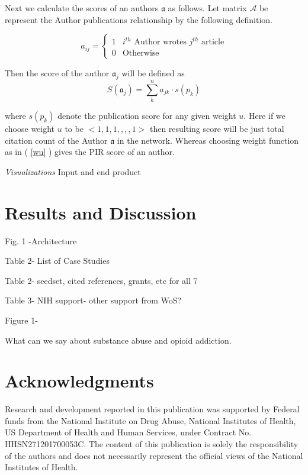 \documentclass[review]{elsarticle}
\begin{document}
Next we calculate the scores of an authors $\mathfrak{a}$ as follows. Let matrix $\mathcal {A}$ be represent the Author publications relationship  by the following definition.

\begin{equation}
a_{ij} = \begin{cases}
1 &\text{$i^{th}$ Author wrotes $j^{th}$ article}\\
0 &\text{Otherwise}
\end{cases}
\end{equation}

Then the score of the author $\mathfrak{a}_j$ will be defined as 
\begin{equation}
S(\mathfrak{a}_j) =  \sum_k^n a_{jk} \cdot  s(p_k) 
\end{equation}

where $s(p_k)$ denote the publication score for any given weight $u$. Here if we choose weight $u$ to be $ <1,1,1,,,,1>$ then resulting score will be just total citation count of the Author $\mathfrak{a}$ in the network. Whereas choosing weight function as in ( \ref{wu} ) gives the PIR score  of an author.

\emph{Visualizations} Input and end product

\section*{Results and Discussion}

Fig. 1 -Architecture

Table 2- List of Case Studies

Table 2- seedset, cited references, grants, etc for all 7 

Table 3- NIH support- other support from WoS?

Figure 1- 

What can we say about substance abuse and opioid addiction. 

\section*{Acknowledgments} Research and development reported in this publication was supported by Federal funds from the National Institute on Drug Abuse, National Institutes of Health, US Department of Health and Human Services, under Contract No. HHSN271201700053C. The content of this publication is solely the responsibility of the authors and does not necessarily represent the official views of the National Institutes of Health.
\end{document}
